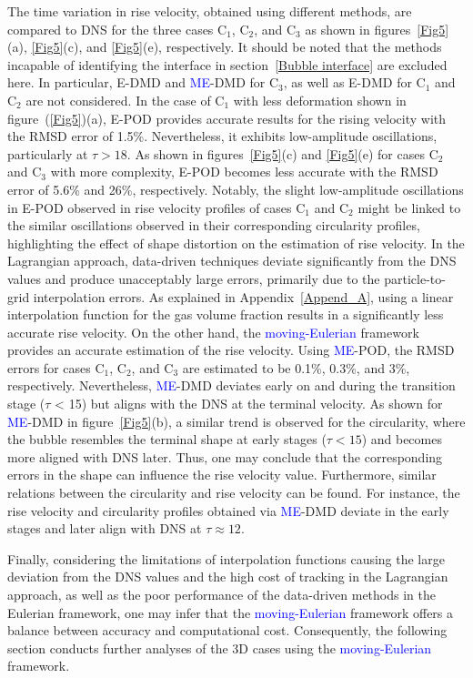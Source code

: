 \documentclass[a4paper,fleqn]{cas-sc}
\newcommand{\hl}[1]{\textcolor{blue}{#1}}
\newcommand{\hl}[1]{#1}
\begin{document}
	The time variation in rise velocity, obtained using different methods, are compared to DNS for the three cases C$_1$, C$_2$, and C$_3$ as shown in figures~\ref{Fig5}(a), \ref{Fig5}(c), and \ref{Fig5}(e), respectively. It should be noted that the methods incapable of identifying the interface in section~\ref{Bubble interface} are excluded here. In particular, E-DMD and \hl{ME}-DMD for C$_3$, as well as E-DMD for C$_1$ and C$_2$ are not considered. In the case of C$_1$ with less deformation shown in figure~(\ref{Fig5})(a), E-POD provides accurate results for the rising velocity with the RMSD error of 1.5\%. Nevertheless, it exhibits low-amplitude oscillations, particularly at $\tau >18$. As shown in figures~\ref{Fig5}(c) and \ref{Fig5}(e) for cases C$_2$ and C$_3$ with more complexity, E-POD becomes less accurate with the RMSD error of 5.6\% and 26\%, respectively. Notably, the slight low-amplitude oscillations in E-POD observed in rise velocity profiles of cases C$_1$ and C$_2$ might be linked to the similar oscillations observed in their corresponding circularity profiles, highlighting the effect of shape distortion on the estimation of rise velocity. In the Lagrangian approach, data-driven techniques deviate significantly from the DNS values and produce unacceptably large errors, primarily due to the particle-to-grid interpolation errors. As explained in Appendix~\ref{Append_A}, using a linear interpolation function for the gas volume fraction results in a significantly less accurate rise velocity. On the other hand, the \hl{moving-Eulerian} framework provides an accurate estimation of the rise velocity. Using \hl{ME}-POD, the RMSD errors for cases C$_1$, C$_2$, and C$_3$ are estimated to be 0.1\%, 0.3\%, and 3\%, respectively. Nevertheless, \hl{ME}-DMD deviates early on and during the transition stage ($\tau$ < 15) but aligns with the DNS at the terminal velocity. As shown for \hl{ME}-DMD in figure~\ref{Fig5}(b), a similar trend is observed for the circularity, where the bubble resembles the terminal shape at early stages ($\tau < 15$) and becomes more aligned with DNS later. Thus, one may conclude that the corresponding errors in the shape can influence the rise velocity value. Furthermore, similar relations between the circularity and rise velocity can be found. For instance, the rise velocity and circularity profiles obtained via \hl{ME}-DMD deviate in the early stages and later align with DNS at $\tau \approx 12$. 
	
	Finally, considering the limitations of interpolation functions causing the large deviation from the DNS values and the high cost of tracking in the Lagrangian approach, as well as the poor performance of the data-driven methods in the Eulerian framework, one may infer that the \hl{moving-Eulerian} framework offers a balance between accuracy and computational cost. Consequently, the following section conducts further analyses of the 3D cases using the \hl{moving-Eulerian} framework.
	
\end{document}
